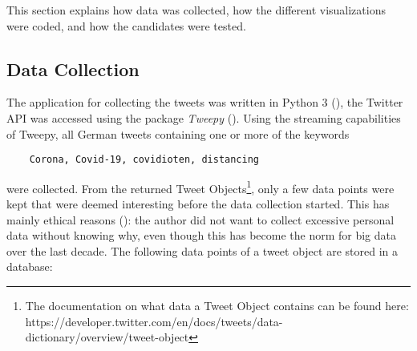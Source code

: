 This section explains how data was collected, how the different visualizations were coded, and how the candidates were tested.

\subsection{Data Collection}

The application for collecting the tweets was written in Python 3 (\cite{10.5555/1593511}), the Twitter API was accessed using the package \emph{Tweepy} (\cite{roesslein2020tweepy}). Using the streaming capabilities of Tweepy, all German tweets containing one or more of the keywords \begin{verbatim}
    Corona, Covid-19, covidioten, distancing
\end{verbatim}
were collected. From the returned Tweet Objects\footnote{The documentation on what data a Tweet Object contains can be found here: https://developer.twitter.com/en/docs/tweets/data-dictionary/overview/tweet-object}, only a few data points were kept that were deemed interesting before the data collection started. This has mainly ethical reasons (\cite{richards2014big}): the author did not want to collect excessive personal data without knowing why, even though this has become the norm for big data over the last decade. The following data points of a tweet object are stored in a database:
